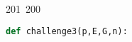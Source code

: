 201~200~\documentclass{article}
\begin{document}
	                                                                        	                                                                    	                                	                    	                    	                        	                        	                    	                                                                	                	                                                                    	                    							                                                                                                                                                                                                    		                                                                                                                        				    			\begin{lstlisting}[language=Python, caption = Cracking private key Chall 3]
	                                                                        	                                                                    	                                	                    	                    	                        	                        	                    	                                                                	                	                                                                    	                    							                                                                                                                                                                                                    		                                                                                                                        				    			def challenge3(p,E,G,n):

	                                                                        	                                                                    	                                	                    	                    	                        	                        	                    	                                                                	                	                                                                    	                    							                                                                                                                                                                                                    		                                                                                                                        				    			        ...


\end{lstlisting}
\end{document}
